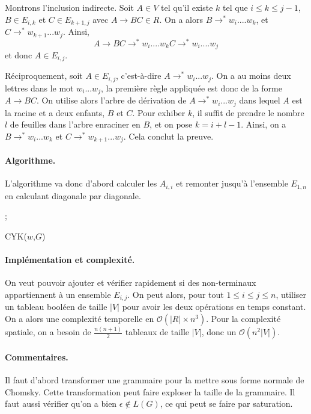Montrons l'inclusion indirecte. Soit $A\in V$ tel qu'il existe $k$ tel que $i\leq k \leq j-1$, $B \in E_{i,k}$ et $C\in E_{k+1,j}$ avec $A\rightarrow BC \in R$. On a alors $B\rightarrow^* w_i....w_k$, et $C\rightarrow^* w_{k+1}...w_j$. Ainsi,
$$
A\rightarrow BC \rightarrow^* w_i....w_k C \rightarrow^* w_i....w_j
$$
et donc $A\in E_{i,j}$.

Réciproquement, soit $A\in E_{i,j}$, c'est-à-dire $A\rightarrow^* w_i...w_j$. On a au moins deux lettres dans le mot $w_i...w_j$, la première règle appliquée est donc de la forme $A\rightarrow BC$. On utilise alors l'arbre de dérivation de $A\rightarrow^*w_i...w_j$ dans lequel $A$ est la racine et a deux enfants, $B$ et $C$. Pour exhiber $k$, il suffit de prendre le nombre $l$ de feuilles dans l'arbre enraciner en $B$, et on pose $k=i+l-1$. Ainsi, on a $B\rightarrow^* w_i...w_k$ et $C \rightarrow^* w_{k+1}...w_j$. Cela conclut la preuve.


\paragraph{Algorithme.} L'algorithme va donc d'abord calculer les $A_{i,i}$ et remonter jusqu'à l'ensemble $E_{1,n}$ en calculant diagonale par diagonale.

\begin{algorithm}



 ;
\caption{CYK($w$,$G$)}
\end{algorithm}

\paragraph{Implémentation et complexité.} On veut pouvoir ajouter et vérifier rapidement si des non-terminaux appartiennent à un ensemble $E_{i,j}$. On peut alors, pour tout $1\leq i \leq j \leq n$, utiliser un tableau booléen de taille $|V|$ pour avoir les deux opérations en temps constant. On a alors une complexité temporelle en $\mathcal{O}(|R| \times n^3)$. Pour la complexité spatiale, on a besoin de $\frac{n(n+1)}{2}$ tableaux de taille $|V|$, donc un $\mathcal{O}(n^2|V|)$.


\paragraph{Commentaires.} Il faut d'abord transformer une grammaire pour la mettre sous forme normale de Chomsky. Cette transformation peut faire exploser la taille de la grammaire. Il faut aussi vérifier qu'on a bien $\epsilon \notin L(G)$, ce qui peut se faire par saturation.
